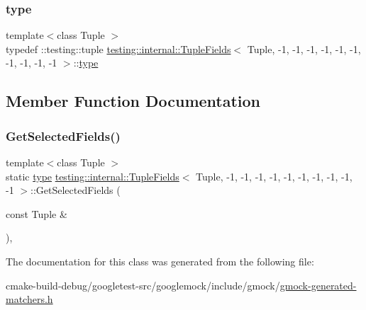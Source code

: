 \subsubsection{\texorpdfstring{type}{type}}
{\footnotesize\ttfamily template$<$class Tuple $>$ \\
typedef \+::testing\+::tuple \mbox{\hyperlink{classtesting_1_1internal_1_1TupleFields}{testing\+::internal\+::\+Tuple\+Fields}}$<$ Tuple, -\/1, -\/1, -\/1, -\/1, -\/1, -\/1, -\/1, -\/1, -\/1, -\/1 $>$\+::\mbox{\hyperlink{classtesting_1_1internal_1_1TupleFields_3_01Tuple_00_01-1_00_01-1_00_01-1_00_01-1_00_01-1_00_01-e023d39d312048e71832a898e9e07f70_a853fa65a18c6b392327ae2cf59bc9571}{type}}}



\subsection{Member Function Documentation}
\mbox{\label{classtesting_1_1internal_1_1TupleFields_3_01Tuple_00_01-1_00_01-1_00_01-1_00_01-1_00_01-1_00_01-e023d39d312048e71832a898e9e07f70_a50c35eab642d04560d5a412cd10246ce}} 
\subsubsection{\texorpdfstring{GetSelectedFields()}{GetSelectedFields()}}
{\footnotesize\ttfamily template$<$class Tuple $>$ \\
static \mbox{\hyperlink{classtesting_1_1internal_1_1TupleFields_3_01Tuple_00_01-1_00_01-1_00_01-1_00_01-1_00_01-1_00_01-e023d39d312048e71832a898e9e07f70_a853fa65a18c6b392327ae2cf59bc9571}{type}} \mbox{\hyperlink{classtesting_1_1internal_1_1TupleFields}{testing\+::internal\+::\+Tuple\+Fields}}$<$ Tuple, -\/1, -\/1, -\/1, -\/1, -\/1, -\/1, -\/1, -\/1, -\/1, -\/1 $>$\+::Get\+Selected\+Fields (\begin{DoxyParamCaption}\item[{const Tuple \&}]{ }\end{DoxyParamCaption})\hspace{0.3cm}{\ttfamily [inline]}, {\ttfamily [static]}}



The documentation for this class was generated from the following file\+:\begin{DoxyCompactItemize}
\item 
cmake-\/build-\/debug/googletest-\/src/googlemock/include/gmock/\mbox{\hyperlink{gmock-generated-matchers_8h}{gmock-\/generated-\/matchers.\+h}}\end{DoxyCompactItemize}
